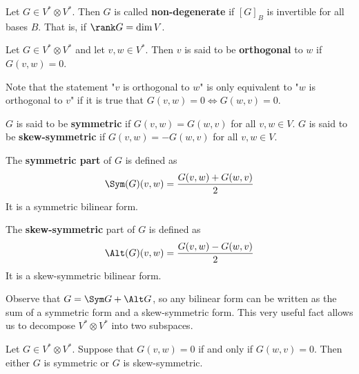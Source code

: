 \begin{defn} Let $G \in V^* \otimes V^*$. Then $G$ is called \textbf{non-degenerate} if $[G]_{B}$ is invertible for all bases $B$. That is, if $\rank G = \dim V$.
\end{defn}
\begin{defn}[Orthogonal] Let $G \in V^* \otimes V^*$ and let $v,w \in V^*$. Then $v$ is said to be \textbf{orthogonal} to $w$ if $G(v,w) = 0$.
\end{defn}
Note that the statement "$v$ is orthogonal to $w$" is only equivalent to "$w$ is orthogonal to $v$" if it is true that  $G(v,w)=0\iff G(w,v)=0$.
\begin{defn}
$G$ is said to be \textbf{symmetric} if $G(v,w)=G(w,v)$ for all $v,w\in V$. $G$ is said to be \textbf{skew-symmetric} if $G(v,w)=-G(w,v)$ for all $v,w
\in V$.
\end{defn}
\begin{defn}
    The \textbf{symmetric part
    } of $G$ is defined as
    \begin{equation}
        \Sym(G)(v,w) = \frac{G(v,w)+G(w,v)}{2}
    \end{equation}
    It is a symmetric bilinear form.

    The \textbf{skew-symmetric} part of $G$ is defined as
    \begin{equation}
        \Alt(G)(v,w) = \frac{G(v,w)-G(w,v)}{2}
    \end{equation}
    It is a skew-symmetric bilinear form.
\end{defn}
Observe that $G = \Sym G + \Alt G$, so any bilinear form can be written as the sum of a symmetric form and a skew-symmetric form. This very useful fact allows us to decompose $V^* \otimes V^*$ into two subspaces.
\begin{thm}
    Let $G \in V^*\otimes V^*$. Suppose that $G(v,w)=0$ if and only if $G(w,v)=0$. Then either $G$ is symmetric or $G$ is skew-symmetric.
\end{thm}
